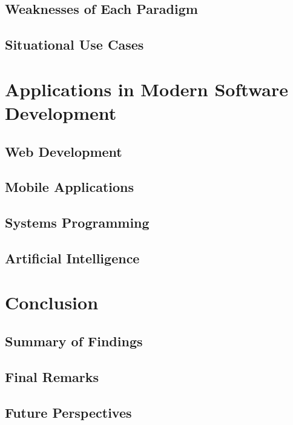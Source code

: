 \documentclass[11pt]{article}
\begin{document}
\subsection{Weaknesses of Each Paradigm}
\subsection{Situational Use Cases}

\section{Applications in Modern Software Development}
\subsection{Web Development}
\subsection{Mobile Applications}
\subsection{Systems Programming}
\subsection{Artificial Intelligence}

\section{Conclusion}
\subsection{Summary of Findings}
\subsection{Final Remarks}
\subsection{Future Perspectives}
\end{document}
